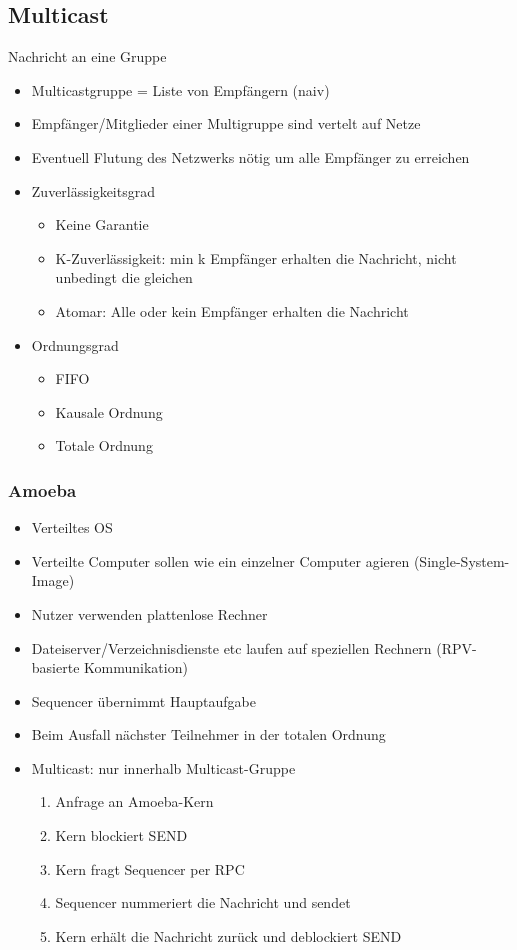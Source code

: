 \documentclass{scrartcl}
\begin{document}
\subsection{Multicast} Nachricht an eine Gruppe
\begin{itemize}
\item Multicastgruppe = Liste von Empfängern (naiv)
\item Empfänger/Mitglieder einer Multigruppe sind vertelt auf Netze
\item Eventuell Flutung des Netzwerks nötig um alle Empfänger zu erreichen
\item Zuverlässigkeitsgrad
\begin{itemize}
\item Keine Garantie
\item K-Zuverlässigkeit: min k Empfänger erhalten die Nachricht, nicht unbedingt die gleichen
\item Atomar: Alle oder kein Empfänger erhalten die Nachricht
\end{itemize}
\item Ordnungsgrad
\begin{itemize}
\item FIFO
\item Kausale Ordnung
\item Totale Ordnung
\end{itemize}
\end{itemize}





\subsubsection{Amoeba} \label{amoe}
\begin{itemize}
\item Verteiltes OS
\item Verteilte Computer sollen wie ein einzelner Computer agieren (Single-System-Image)
\item Nutzer verwenden plattenlose Rechner
\item Dateiserver/Verzeichnisdienste etc laufen auf speziellen Rechnern (RPV-basierte Kommunikation)
\item Sequencer übernimmt Hauptaufgabe
\item Beim Ausfall nächster Teilnehmer in der totalen Ordnung
\item Multicast: nur innerhalb Multicast-Gruppe
\begin{enumerate}
\item Anfrage an Amoeba-Kern
\item Kern blockiert SEND
\item Kern fragt Sequencer per RPC
\item Sequencer nummeriert die Nachricht und sendet
\item Kern erhält die Nachricht zurück und deblockiert SEND
\end{enumerate}
\end{itemize}
\end{document}
